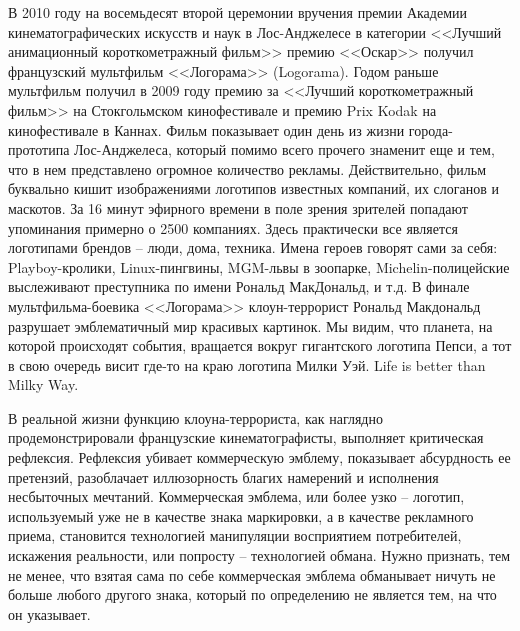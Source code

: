В 2010 году на восемьдесят второй церемонии вручения премии Академии
кинематографических искусств и наук в Лос-Анджелесе в категории <<Лучший
анимационный короткометражный фильм>> премию <<Оскар>> получил французский
мультфильм <<Логорама>> (Logorama). Годом раньше мультфильм получил в 2009 году
премию за <<Лучший короткометражный фильм>> на Стокгольмском кинофестивале и премию
Prix Kodak на кинофестивале в Каннах. Фильм показывает один день из жизни
города-прототипа Лос-Анджелеса, который помимо всего прочего знаменит еще и
тем, что в нем представлено огромное количество рекламы. Действительно, фильм
буквально кишит изображениями логотипов известных компаний, их слоганов и маскотов.
За 16 минут эфирного времени в поле зрения зрителей попадают упоминания примерно
о 2500 компаниях. Здесь практически все является логотипами брендов -- люди,
дома, техника. Имена героев говорят сами за себя: Playboy-кролики,
Linux-пингвины, MGM-львы в зоопарке, Michelin-полицейские выслеживают
преступника по имени Рональд МакДональд, и т.д. В финале мультфильма-боевика
<<Логорама>> клоун-террорист Рональд Макдональд разрушает эмблематичный мир
красивых картинок. Мы видим, что планета, на которой происходят события,
вращается вокруг гигантского логотипа Пепси, а тот в свою очередь висит где-то
на краю логотипа Милки Уэй. Life is better than Milky Way.

В реальной жизни функцию клоуна-террориста, как наглядно продемонстрировали
французские кинематографисты, выполняет критическая рефлексия. Рефлексия убивает
коммерческую эмблему, показывает абсурдность ее претензий, разоблачает
иллюзорность благих намерений и исполнения несбыточных мечтаний. Коммерческая
эмблема, или более узко -- логотип, используемый уже не в качестве знака
маркировки, а в качестве рекламного приема, становится технологией манипуляции
восприятием потребителей, искажения реальности, или попросту --
технологией обмана. Нужно признать, тем не менее, что взятая сама по себе
коммерческая эмблема обманывает ничуть не больше любого другого знака, который
по определению не является тем, на что он указывает.

